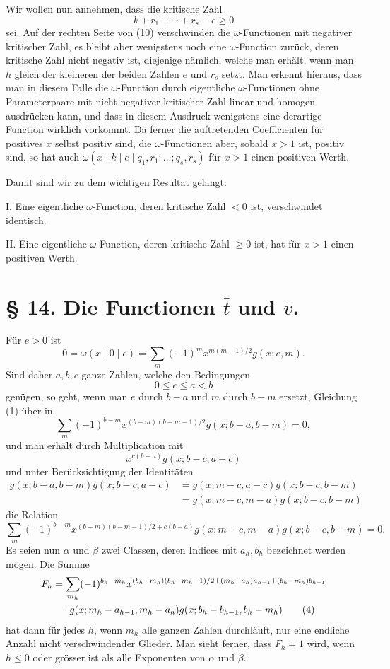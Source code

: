 \documentclass[11pt,a4paper]{article}
\begin{document}
Wir wollen nun annehmen, dass die kritische Zahl
\[
 k+r_1+\cdots+r_s-e\ge0
\]
sei. Auf der rechten Seite von (10) verschwinden die $\omega$-Functionen mit negativer kritischer Zahl, es bleibt aber wenigstens noch eine $\omega$-Function zurück, deren kritische Zahl nicht negativ ist, diejenige nämlich, welche man erhält, wenn man $h$ gleich der kleineren der beiden Zahlen $e$ und $r_s$ setzt. Man erkennt hieraus, dass man in diesem Falle die $\omega$-Function durch eigentliche $\omega$-Functionen ohne Parameterpaare mit nicht negativer kritischer Zahl linear und homogen ausdrücken kann, und dass in diesem Ausdruck wenigstens eine derartige Function wirklich vorkommt. Da ferner die auftretenden Coefficienten für positives $x$ selbst positiv sind, die $\omega$-Functionen aber, sobald $x>1$ ist, positiv sind, so hat auch $\omega(x\mid k\mid e\mid q_1,r_1;\ldots;q_s,r_s)$ für $x>1$ einen positiven Werth.

Damit sind wir zu dem wichtigen Resultat gelangt:

I. Eine eigentliche $\omega$-Function, deren kritische Zahl $<0$ ist, verschwindet identisch.

II. Eine eigentliche $\omega$-Function, deren kritische Zahl $\ge0$ ist, hat für $x>1$ einen positiven Werth.

\section*{§ 14. Die Functionen $\bar t$ und $\bar v$.}

Für $e>0$ ist
\begin{equation}
 0=\omega(x\mid0\mid e)=\sum_m(-1)^m x^{m(m-1)/2}g(x;e,m).
\tag{1}
\end{equation}
Sind daher $a,b,c$ ganze Zahlen, welche den Bedingungen
\begin{equation}
 0\le c\le a<b
\tag{2}
\end{equation}
genügen, so geht, wenn man $e$ durch $b-a$ und $m$ durch $b-m$ ersetzt, Gleichung (1) über in
\[
 \sum_m(-1)^{b-m}x^{(b-m)(b-m-1)/2}g(x;b-a,b-m)=0,
\]
und man erhält durch Multiplication mit
\[
 x^{c(b-a)}g(x;b-c,a-c)
\]
und unter Berücksichtigung der Identitäten
\begin{align*}
 g(x;b-a,b-m)g(x;b-c,a-c)
 &=g(x;m-c,a-c)g(x;b-c,b-m)\\
 &=g(x;m-c,m-a)g(x;b-c,b-m)
\end{align*}
die Relation
\begin{equation}
 \sum_m(-1)^{b-m}x^{(b-m)(b-m-1)/2+c(b-a)}
 g(x;m-c,m-a)g(x;b-c,b-m)=0.
\tag{3}
\end{equation}
Es seien nun $\alpha$ und $\beta$ zwei Classen, deren Indices mit $a_h,b_h$ bezeichnet werden mögen. Die Summe
\begin{align}
F_h&=\sum_{m_h}(-1)^{b_h-m_h}
 x^{(b_h-m_h)(b_h-m_h-1)/2+(m_h-a_h)a_{h-1}+(b_h-m_h)b_{h-1}}\notag\\
&\quad\cdot g(x;m_h-a_{h-1},m_h-a_h)g(x;b_h-b_{h-1},b_h-m_h)
\tag{4}
\end{align}
hat dann für jedes $h$, wenn $m_h$ alle ganzen Zahlen durchläuft, nur eine endliche Anzahl nicht verschwindender Glieder. Man sieht ferner, dass $F_h=1$ wird, wenn $h\le0$ oder grösser ist als alle Exponenten von $\alpha$ und $\beta$.
\end{document}
